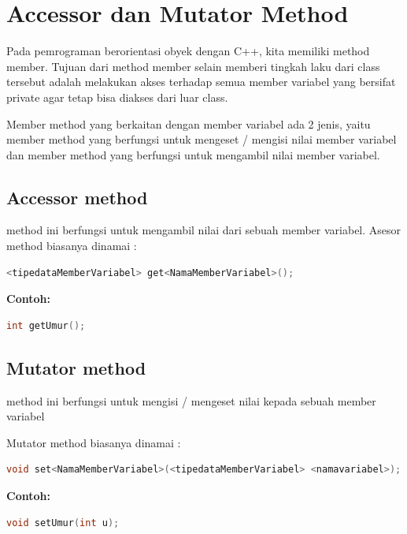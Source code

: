 \section{Accessor dan Mutator
Method}\label{accessor-dan-mutator-method}

Pada pemrograman berorientasi obyek dengan C++, kita memiliki method
member. Tujuan dari method member selain memberi tingkah laku dari class
tersebut adalah melakukan akses terhadap semua member variabel yang
bersifat private agar tetap bisa diakses dari luar class.

Member method yang berkaitan dengan member variabel ada 2 jenis, yaitu
member method yang berfungsi untuk mengeset / mengisi nilai member
variabel dan member method yang berfungsi untuk mengambil nilai member
variabel.

\subsection{Accessor method}\label{accessor-method}

method ini berfungsi untuk mengambil nilai dari sebuah member variabel.
Asesor method biasanya dinamai :

\begin{lstlisting}[language=c++, numbers=none]
<tipedataMemberVariabel> get<NamaMemberVariabel>();
\end{lstlisting}

\textbf{Contoh:}

\begin{lstlisting}[language=c++, numbers=none]
int getUmur();
\end{lstlisting}

\subsection{Mutator method}\label{mutator-method}

method ini berfungsi untuk mengisi / mengeset nilai kepada sebuah member
variabel

Mutator method biasanya dinamai :

\begin{lstlisting}[language=c++, numbers=none]
void set<NamaMemberVariabel>(<tipedataMemberVariabel> <namavariabel>);
\end{lstlisting}

\textbf{Contoh:}

\begin{lstlisting}[language=c++, numbers=none]
void setUmur(int u);
\end{lstlisting}

